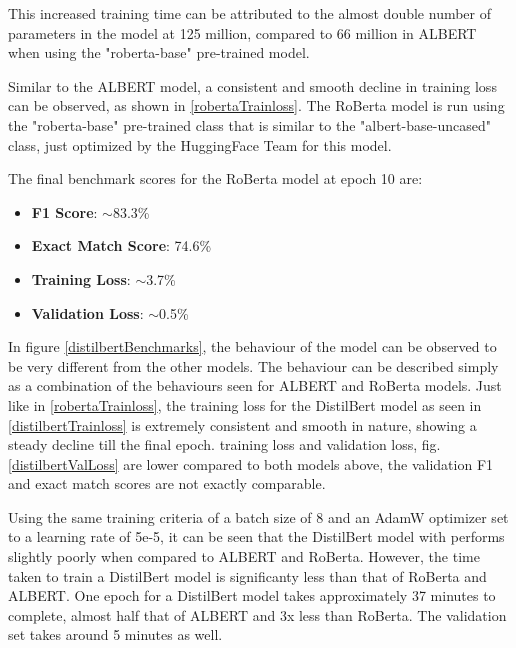 \documentclass[a4paper,12pt]{report}
\begin{document}
	This increased training time can be attributed to the almost double number of parameters in the model at 125 million, compared to 66 million in ALBERT when using the "roberta-base" pre-trained model. 
	
	Similar to the ALBERT model, a consistent and smooth decline in training loss can be observed, as shown in \ref{robertaTrainloss}. The RoBerta model is run using the "roberta-base" pre-trained class that is similar to the "albert-base-uncased" class, just optimized by the HuggingFace Team for this model. 

	The final benchmark scores for the RoBerta model at epoch 10 are:
	\begin{itemize}
		\item \textbf{F1 Score}:  $\sim$83.3\%
		\item \textbf{Exact Match Score}: 74.6\%
		\item \textbf{Training Loss}:  $\sim$3.7\%
		\item \textbf{Validation Loss}: $\sim$0.5\%
	\end{itemize}


	In figure \ref{distilbertBenchmarks}, the behaviour of the model can be observed to be very different from the other models. The behaviour can be described simply as a combination of the behaviours seen for ALBERT and RoBerta models. Just like in \ref{robertaTrainloss}, the training loss for the DistilBert model as seen in \ref{distilbertTrainloss} is extremely consistent and smooth in nature, showing a steady decline till the final epoch. training loss and validation loss, fig. \ref{distilbertValLoss} are lower compared to both models above, the validation F1 and exact match scores are not exactly comparable. 
	
	Using the same training criteria of a batch size of 8 and an AdamW optimizer set to a learning rate of 5e-5, it can be seen that the DistilBert model with performs slightly poorly when compared to ALBERT and RoBerta. However, the time taken to train a DistilBert model is significanty less than that of RoBerta and ALBERT. One epoch for a DistilBert model takes approximately 37 minutes to complete, almost half that of ALBERT and 3x less than RoBerta. The validation set takes around 5 minutes as well. 
	
\end{document}

